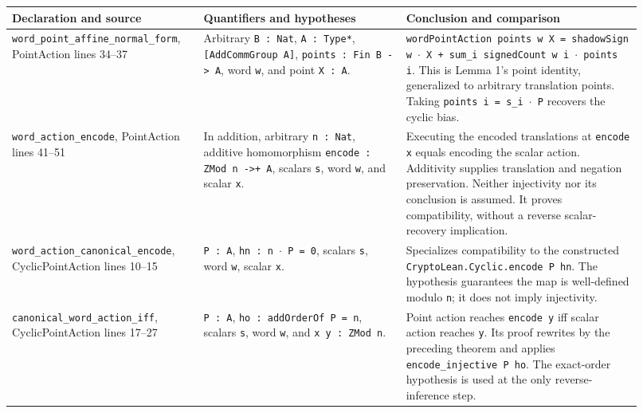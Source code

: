 \documentclass[10pt]{article}
\begin{document}
\small\begin{longtable}{>{\raggedright\arraybackslash}p{0.27\linewidth}>{\raggedright\arraybackslash}p{0.3\linewidth}>{\raggedright\arraybackslash}p{0.35\linewidth}}
\hline
Declaration and source & Quantifiers and hypotheses & Conclusion and comparison \\ \hline
\texttt{word\allowbreak{}\_\allowbreak{}point\allowbreak{}\_\allowbreak{}affine\allowbreak{}\_\allowbreak{}normal\allowbreak{}\_\allowbreak{}form}, PointAction lines 34--37 & Arbitrary \texttt{B : Nat}, \texttt{A : Type*}, \texttt{[AddCommGroup A]}, \texttt{points : Fin B \allowbreak{}-\allowbreak{}> A}, word \texttt{w}, and point \texttt{X : A}. & \texttt{wordPointAction points w X = shadowSign w $\cdot$ X + sum\allowbreak{}\_\allowbreak{}i signedCount w i $\cdot$ points i}. This is Lemma 1's point identity, generalized to arbitrary translation points. Taking \texttt{points i = s\allowbreak{}\_\allowbreak{}i $\cdot$ P} recovers the cyclic bias. \\
\texttt{word\allowbreak{}\_\allowbreak{}action\allowbreak{}\_\allowbreak{}encode}, PointAction lines 41--51 & In addition, arbitrary \texttt{n : Nat}, additive homomorphism \texttt{encode : ZMod n \allowbreak{}-\allowbreak{}>+ A}, scalars \texttt{s}, word \texttt{w}, and scalar \texttt{x}. & Executing the encoded translations at \texttt{encode x} equals encoding the scalar action. Additivity supplies translation and negation preservation. Neither injectivity nor its conclusion is assumed. It proves compatibility, without a reverse scalar-recovery implication. \\
\texttt{word\allowbreak{}\_\allowbreak{}action\allowbreak{}\_\allowbreak{}canonical\allowbreak{}\_\allowbreak{}encode}, CyclicPointAction lines 10--15 & \texttt{P : A}, \texttt{hn : n $\cdot$ P = 0}, scalars \texttt{s}, word \texttt{w}, scalar \texttt{x}. & Specializes compatibility to the constructed \texttt{CryptoLean\allowbreak{}.\allowbreak{}Cyclic\allowbreak{}.\allowbreak{}encode P hn}. The hypothesis guarantees the map is well-defined modulo \texttt{n}; it does not imply injectivity. \\
\texttt{canonical\allowbreak{}\_\allowbreak{}word\allowbreak{}\_\allowbreak{}action\allowbreak{}\_\allowbreak{}iff}, CyclicPointAction lines 17--27 & \texttt{P : A}, \texttt{ho : addOrderOf P = n}, scalars \texttt{s}, word \texttt{w}, and \texttt{x y : ZMod n}. & Point action reaches \texttt{encode y} iff scalar action reaches \texttt{y}. Its proof rewrites by the preceding theorem and applies \texttt{encode\allowbreak{}\_\allowbreak{}injective P ho}. The exact-order hypothesis is used at the only reverse-inference step. \\
\hline\end{longtable}\normalsize
\end{document}
